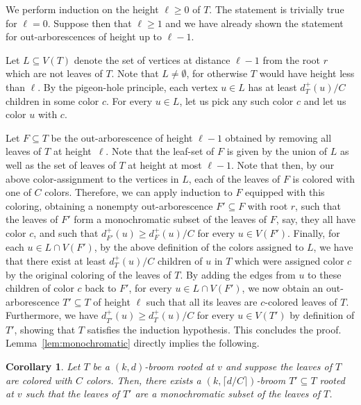 \documentclass[a4paper,11pt]{article}
\makeatletter
\renewenvironment{proof}[1][\proofname] {\par\pushQED{\qed}\normalfont\topsep6\p@\@plus6\p@\relax\trivlist\item[\hskip\labelsep\bfseries#1\@addpunct{.}]\ignorespaces}{\popQED\endtrivlist\@endpefalse}
\newtheorem{corollary}[theorem]{\bf Corollary}
\theoremstyle{definition}
\makeatother
\begin{document}
\begin{proof}
    We perform induction on the height $\ell\ge 0$ of $T$. The statement is trivially true for $\ell=0$. Suppose then that $\ell\geq 1$ and we have already shown the statement for out-arborescences of height up to $\ell-1$. 
    
    Let $L\subseteq V(T)$ denote the set of vertices at distance $\ell-1$ from the root $r$ which are not leaves of $T$. Note that $L\neq \emptyset$, for otherwise $T$ would have height less than $\ell$. By the pigeon-hole principle, each vertex $u\in L$ has at least $d^+_{T}(u)/C$ children in some color $c$. For every $u\in L$, let us pick any such color $c$ and let us color $u$ with $c$. 
    
    Let $F\subseteq T$ be the out-arborescence of height $\ell-1$ obtained by removing all leaves of $T$ at height~$\ell$. Note that the leaf-set of $F$ is given by the union of $L$ as well as the set of leaves of $T$ at height at most $\ell-1$. Note that then, by our above color-assignment to the vertices in $L$, each of the leaves of $F$ is colored with one of $C$ colors. Therefore, we can apply induction to $F$ equipped with this coloring, obtaining a nonempty out-arborescence $F'\subseteq F$ with root $r$, such that the leaves of $F'$ form a monochromatic subset of the leaves of $F$, say, they all have color $c$, and such that $d^+_{F'}(u)\geq d^{+}_F(u)/C$ for every $u\in V(F')$. Finally, for each $u\in L\cap V(F')$, by the above definition of the colors assigned to $L$, we have that there exist at least $d^+_{T}(u)/C$ children of $u$ in $T$ which were assigned color $c$ by the original coloring of the leaves of $T$. By adding the edges from $u$ to these children of color $c$ back to $F'$, for every $u\in L\cap V(F')$, we now obtain an out-arborescence $T'\subseteq T$ of height $\ell$ such that all its leaves are $c$-colored leaves of $T$. Furthermore, we have $d_{T'}^+(u)\ge d_T^+(u)/C$ for every $u\in V(T')$ by definition of $T'$, showing that $T$ satisfies the induction hypothesis. This concludes the proof.
\end{proof}
Lemma~\ref{lem:monochromatic} directly implies the following.
\begin{corollary}\label{cor: colored trees}
    Let $T$ be a $(k,d)$-broom rooted at $v$ and suppose the leaves of $T$ are colored with $C$ colors. Then, there exists a $(k,\lceil d/C\rceil)$-broom $T'\subseteq T$ rooted at $v$ such that the leaves of $T'$ are a monochromatic subset of the leaves of $T$.
\end{corollary}
\end{document}
